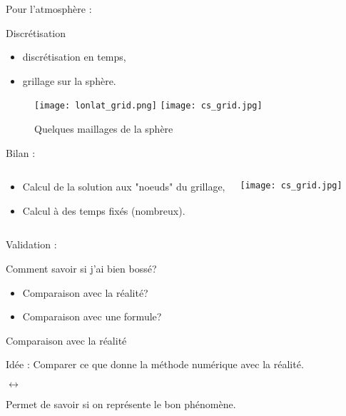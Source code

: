 \documentclass[11pt]{beamer}
\begin{document}
\begin{frame}{Pour l'atmosphère :}

\begin{block}{Discrétisation}
\begin{itemize}
\item discrétisation en temps,
\item grillage sur la sphère.
\end{itemize}
\end{block}

\begin{figure}
\texttt{[image: lonlat\_grid.png]} \hspace{1cm}
\texttt{[image: cs\_grid.jpg]}
\caption{Quelques maillages de la sphère}
\end{figure}

\end{frame}

\begin{frame}{Bilan :}
\begin{columns}
\begin{block}{}
\begin{itemize}
\item Calcul de la solution aux "noeuds" du grillage,
\item Calcul à des temps fixés (nombreux).
\end{itemize}
\end{block}

\texttt{[image: cs\_grid.jpg]} 

\end{columns}
\end{frame}



\begin{frame}{Validation :}
\begin{block}{}
Comment savoir si j'ai bien bossé?
\end{block}

\pause
\begin{itemize}
\item Comparaison avec la réalité?
\item Comparaison avec une formule?
\end{itemize}
\end{frame}

\begin{frame}{Comparaison avec la réalité}
\begin{block}{Idée :}
Comparer ce que donne la méthode numérique avec la réalité.

\vspace{0.3cm}
\begin{center}
 $\longleftrightarrow$ 
\end{center}
\vspace{0.3cm}
\end{block}

\begin{exampleblock}{}
Permet de savoir si on représente le bon phénomène.
\end{exampleblock}
\end{frame}
\end{document}

